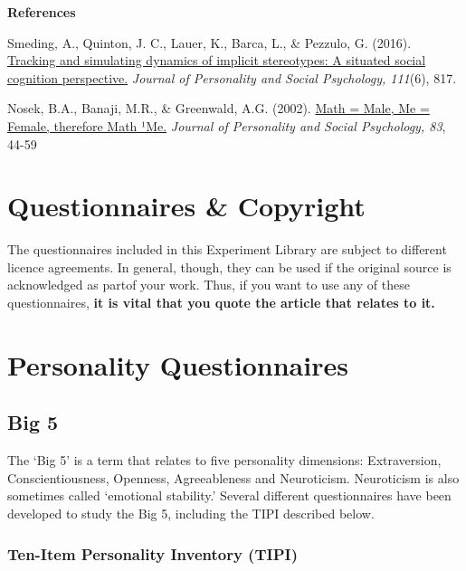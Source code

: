\documentclass[
]{book}
\begin{document}
\textbf{References}

Smeding, A., Quinton, J. C., Lauer, K., Barca, L., \& Pezzulo, G. (2016). \href{https://www.researchgate.net/profile/Jean-Charles_Quinton/publication/308341625_Tracking_and_Simulating_Dynamics_of_Implicit_Stereotypes_A_Situated_Social_Cognition_Perspective/links/581b4c3508aea429b28fc0d0/Tracking-and-Simulating-Dynamics-of-Implicit-Stereotypes-A-Situated-Social-Cognition-Perspective.pdf}{Tracking and simulating dynamics of implicit stereotypes: A situated social cognition perspective.} \emph{Journal of Personality and Social Psychology, 111}(6), 817.

Nosek, B.A., Banaji, M.R., \& Greenwald, A.G. (2002). \href{https://psyarxiv.com/y2g6s}{Math = Male, Me = Female, therefore Math ¹Me.} \emph{Journal of Personality and Social Psychology, 83}, 44-59

\hypertarget{questionnaires-copyright}{%
\chapter{Questionnaires \& Copyright}\label{questionnaires-copyright}}

The questionnaires included in this Experiment Library are subject to different licence agreements. In general, though, they can be used if the original source is acknowledged as partof your work. Thus, if you want to use any of these questionnaires, \textbf{it is vital that you quote the article that relates to it.}

\hypertarget{personality-questionnaires}{%
\chapter{Personality Questionnaires}\label{personality-questionnaires}}

\hypertarget{big-5}{%
\section{Big 5}\label{big-5}}

The `Big 5' is a term that relates to five personality dimensions: Extraversion,
Conscientiousness, Openness, Agreeableness and Neuroticism. Neuroticism is also sometimes called `emotional stability.' Several different questionnaires have been developed to study the Big 5, including the TIPI described below.

\hypertarget{ten-item-personality-inventory-tipi}{%
\subsection{Ten-Item Personality Inventory (TIPI)}\label{ten-item-personality-inventory-tipi}}
\end{document}
